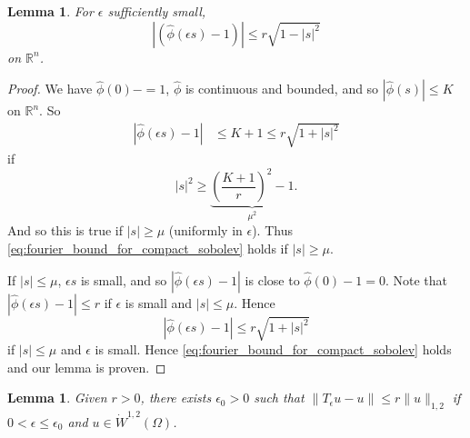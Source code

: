 \documentclass[10pt, oneside, reqno]{amsart}
\theoremstyle{plain}%
\newtheorem{lem}[thm]{Lemma}
\numberwithin{equation}{section}
\theoremstyle{definition}
\theoremstyle{remark}
\newcommand{\R}{\mathbb{R}}
\begin{document}
\begin{lem}
    \label{thm:fourier_bound_for_compact_sobolev}
    For $\epsilon$ sufficiently small, \begin{equation}
        \label{eq:fourier_bound_for_compact_sobolev}
        \left| \left( \hat \phi(\epsilon s) - 1 \right) \right| \leq r \sqrt{1 - |s|^2}
    \end{equation}
    on $\R^n$. 
\end{lem}
\begin{proof}
    We have $\hat \phi(0) -= 1$, $\hat \phi$ is continuous and bounded, and so $\left|\hat \phi(s) \right| \leq K$ on $\R^n$.  
    So \begin{align*}
        \left| \hat \phi(\epsilon s) - 1 \right| &\leq K + 1 \leq r\sqrt{1 + |s|^2}
    \end{align*} if \[
        |s|^2 \geq \underbrace{\left( \frac{K+1}{r} \right)^2 - 1}_{\mu^2}.
        \]  And so this is true if $|s| \geq \mu$ (uniformly in $\epsilon$).  Thus \eqref{eq:fourier_bound_for_compact_sobolev} holds if $|s| \geq \mu$.
     
    If $|s| \leq \mu$, $\epsilon s$ is small, and so $\left|\hat \phi(\epsilon s) - 1 \right|$ is close to $\hat \phi(0) - 1 = 0$.  Note that $\left| \hat \phi(\epsilon s) - 1 \right| \leq r$ if $\epsilon$ is small and $|s| \leq \mu$.  Hence \[
        \left| \hat \phi(\epsilon s) - 1 \right| \leq r \sqrt{1 + |s|^2}
    \]  if $|s| \leq \mu$ and $\epsilon$ is small.  Hence \eqref{eq:fourier_bound_for_compact_sobolev} holds and our lemma is proven.
\end{proof}


\newcommand{\interior}{\textsc{Int\ }}

\begin{lem}
    \label{lem:bound_on_continuity_of_convolution}
    Given $r > 0$, there exists $\epsilon_0 > 0$ such that $\| T_\epsilon u - u \| \leq r \| u \|_{1, 2}$ if $0 < \epsilon \leq \epsilon_0$ and $u \in \dot W^{1, 2}(\Omega)$.
\end{lem}
\end{document}
